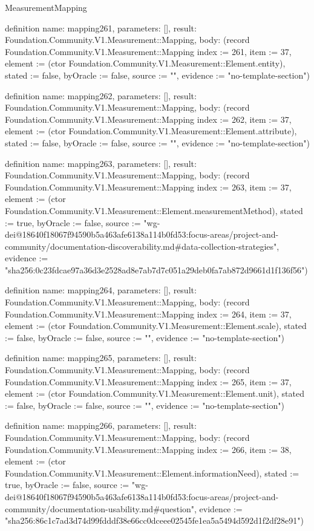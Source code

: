 \begin{lexlean}{MeasurementMapping}
\begin{semanticmodule}
definition{
  name: mapping261,
  parameters: [],
  result: Foundation.Community.V1.Measurement::Mapping,
  body: (record Foundation.Community.V1.Measurement::Mapping {index := 261, item := 37, element := (ctor Foundation.Community.V1.Measurement::Element.entity), stated := false, byOracle := false, source := "", evidence := "no-template-section"})
}

definition{
  name: mapping262,
  parameters: [],
  result: Foundation.Community.V1.Measurement::Mapping,
  body: (record Foundation.Community.V1.Measurement::Mapping {index := 262, item := 37, element := (ctor Foundation.Community.V1.Measurement::Element.attribute), stated := false, byOracle := false, source := "", evidence := "no-template-section"})
}

definition{
  name: mapping263,
  parameters: [],
  result: Foundation.Community.V1.Measurement::Mapping,
  body: (record Foundation.Community.V1.Measurement::Mapping {index := 263, item := 37, element := (ctor Foundation.Community.V1.Measurement::Element.measurementMethod), stated := true, byOracle := false, source := "wg-dei@18640f18067f94590b5a463afe6138a114b0fd53:focus-areas/project-and-community/documentation-discoverability.md#data-collection-strategies", evidence := "sha256:0c23fdcae97a36d3e2528ad8e7ab7d7c051a29deb0fa7ab872d9661d1f136f56"})
}

definition{
  name: mapping264,
  parameters: [],
  result: Foundation.Community.V1.Measurement::Mapping,
  body: (record Foundation.Community.V1.Measurement::Mapping {index := 264, item := 37, element := (ctor Foundation.Community.V1.Measurement::Element.scale), stated := false, byOracle := false, source := "", evidence := "no-template-section"})
}

definition{
  name: mapping265,
  parameters: [],
  result: Foundation.Community.V1.Measurement::Mapping,
  body: (record Foundation.Community.V1.Measurement::Mapping {index := 265, item := 37, element := (ctor Foundation.Community.V1.Measurement::Element.unit), stated := false, byOracle := false, source := "", evidence := "no-template-section"})
}

definition{
  name: mapping266,
  parameters: [],
  result: Foundation.Community.V1.Measurement::Mapping,
  body: (record Foundation.Community.V1.Measurement::Mapping {index := 266, item := 38, element := (ctor Foundation.Community.V1.Measurement::Element.informationNeed), stated := true, byOracle := false, source := "wg-dei@18640f18067f94590b5a463afe6138a114b0fd53:focus-areas/project-and-community/documentation-usability.md#question", evidence := "sha256:86c1c7ad3d74d99fdddf38e66cc0dceee02545fe1ea5a5494d592d1f2df28e91"})
}


\end{semanticmodule}
\end{lexlean}
